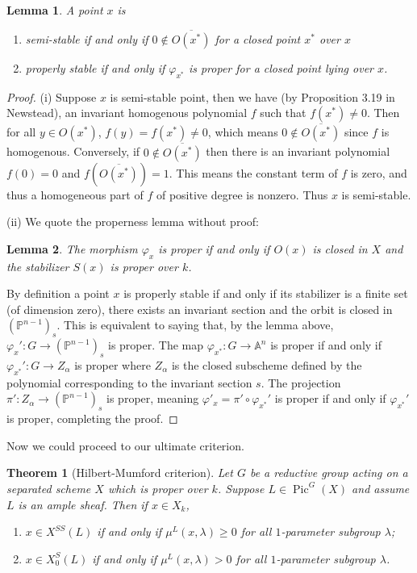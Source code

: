 \documentclass[12pt]{article}
\newtheorem{theorem}{Theorem}[section]
\newtheorem{lemma}{Lemma}[section]
\theoremstyle{remark}
\theoremstyle{definition}
\newcommand{\A}[0]{\mathbb{A}}
\newcommand{\Pic}[0]{\operatorname{Pic}}
\begin{document}
    \begin{lemma}
        A point $x$ is 
        \begin{enumerate}[\normalfont(i)]
            \item semi-stable if and only if $0\notin\overline{O(x^*)}$ for a closed point $x^*$ over $x$
            
            \item properly stable if and only if $\varphi_{x^*}$ is proper for a closed point lying over $x$.
        \end{enumerate}
    \end{lemma}
    \begin{proof}
        (i) Suppose $x$ is semi-stable point, then we have (by Proposition 3.19 in Newstead), an invariant homogenous polynomial $f$ such that $f(x^*)\neq 0$. Then for all $y\in O(x^*)$, $f(y)=f(x^*)\neq 0$, which means $0\notin \overline{O(x^*)}$ since $f$ is homogenous. Conversely, if $0\notin\overline{O(x^*)}$ then there is an invariant polynomial $f(0)=0$ and $f(\overline{O(x^*)})=1$. This means the constant term of $f$ is zero, and thus a homogeneous part of $f$ of positive degree is nonzero. Thus $x$ is semi-stable.

        (ii) We quote the properness lemma without proof:
        \begin{lemma}
            The morphism $\varphi_{x}$ is proper if and only if $O(x)$ is closed in $X$ and the stabilizer $S(x)$ is proper over $k$.
        \end{lemma}
        By definition a point $x$ is properly stable if and only if its stabilizer is a finite set (of dimension zero), there exists an invariant section and the orbit is closed in $(\mathbb P^{n-1})_s$. This is equivalent to saying that, by the lemma above, $\varphi_x':G\to(\mathbb P^{n-1})_s$ is proper. The map $\varphi_{x^*}:G\to \A^n$ is proper if and only if $\varphi_{x^*}':G\to Z_\alpha$ is proper where $Z_\alpha$ is the closed subscheme defined by the polynomial corresponding to the invariant section $s$. The projection $\pi': Z_\alpha\to (\mathbb P^{n-1})_s$ is proper, meaning $\varphi'_x=\pi'\circ\varphi_{x^*}'$ is proper if and only if $\varphi_{x^*}'$ is proper, completing the proof.
    \end{proof}
    Now we could proceed to our ultimate criterion.
    \begin{theorem}[Hilbert-Mumford criterion]
        Let $G$ be a reductive group acting on a separated scheme $X$ which is proper over $k$. Suppose $L\in\Pic^G(X)$ and assume $L$ is an ample sheaf. Then if $x\in X_k$,
        \begin{enumerate}[\normalfont(i)]
            \item $x\in X^{SS}(L)$ if and only if $\mu^L(x,\lambda)\geqslant 0$ for all $1$-parameter subgroup $\lambda$;
            \item $x\in X^{S}_0(L)$ if and only if $\mu^L(x,\lambda)> 0$ for all $1$-parameter subgroup $\lambda$.
        \end{enumerate}
    \end{theorem}
\end{document}
